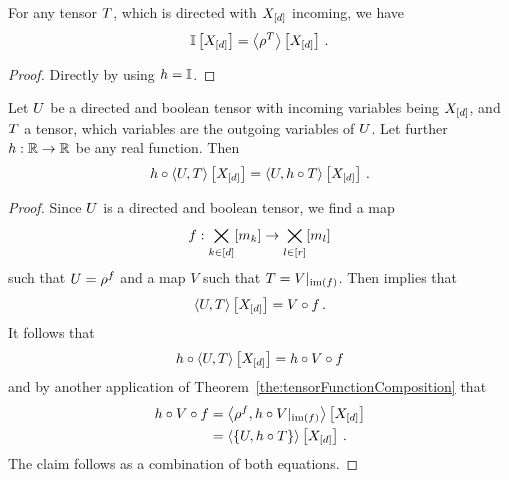 \begin{corollary}\label{cor:onesHead}
	For any tensor $T$, which is directed with $X_{[d]}$ incoming, we have
		\[ \mathbb{I}\left[X_{[d]}\right] = \left\langle \rho^{T}\right\rangle \left[ X_{[d]} \right] \, . \]
\end{corollary}
\begin{proof}
	Directly by using $h=\mathbb{I}$.
\end{proof}

\begin{corollary}\label{cor:directedTrafo}
	Let $U$ be a directed and boolean tensor with incoming variables being $X_{[d]}$, and $T$ a tensor, which variables are the outgoing variables of $U$.
	Let further $h:\mathbb{R}\rightarrow\mathbb{R}$ be any real function.
	Then
		\[ h \circ \left\langle U,T\right\rangle \left[ X_{[d]} \right]
		= \left\langle U,h\circ T\right\rangle \left[ X_{[d]} \right] \, . \]
\end{corollary}
\begin{proof}
	Since $U$ is a directed and boolean tensor, we find a map
		\[ f : \bigtimes_{k\in[d]}[m_{k}] \rightarrow \bigtimes_{l\in[r]}[m_{l}] \]
	such that $U=\rho^{f}$ and a map $V$ such that $T={V}|_{\mathrm{im}\left(f\right)}$.
	Then  implies that
		\[ \left\langle U,T\right\rangle \left[ X_{[d]} \right] = V \circ f \, . \]
	It follows that 
	\begin{align*}
		h \circ \left\langle U,T\right\rangle \left[ X_{[d]} \right] = h \circ V \circ f
	\end{align*}
	and by another application of Theorem~\ref{the:tensorFunctionComposition} that
	\begin{align*}
		h \circ V \circ f
		& = \left\langle \rho^{f}, {h \circ V}|_{\mathrm{im}\left(f\right)}\right\rangle \left[ X_{[d]} \right] \\
		& = \left\langle \{U,h\circ T\}\right\rangle \left[ X_{[d]} \right] \, . 
	\end{align*}
	The claim follows as a combination of both equations.
\end{proof}



